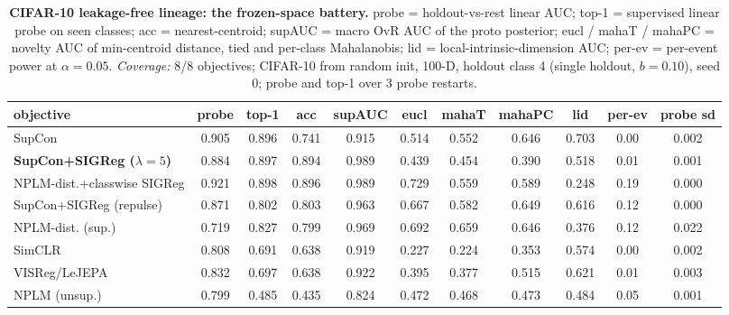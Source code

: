 \begin{landscape}
\begin{table}[p]
\centering
\footnotesize
\setlength{\tabcolsep}{3pt}
\begin{tabular}{lcccccccccc}
\toprule
objective & probe & top-1 & acc & supAUC & eucl & mahaT & mahaPC & lid & per-ev & probe sd \\
\midrule
SupCon & 0.905 & 0.896 & 0.741 & 0.915 & 0.514 & 0.552 & 0.646 & 0.703 & 0.00 & 0.002 \\
\textbf{SupCon+SIGReg ($\lambda{=}5$)} & 0.884 & 0.897 & 0.894 & 0.989 & 0.439 & 0.454 & 0.390 & 0.518 & 0.01 & 0.001 \\
NPLM-dist.+classwise SIGReg & 0.921 & 0.898 & 0.896 & 0.989 & 0.729 & 0.559 & 0.589 & 0.248 & 0.19 & 0.000 \\
SupCon+SIGReg (repulse) & 0.871 & 0.802 & 0.803 & 0.963 & 0.667 & 0.582 & 0.649 & 0.616 & 0.12 & 0.000 \\
NPLM-dist. (sup.) & 0.719 & 0.827 & 0.799 & 0.969 & 0.692 & 0.659 & 0.646 & 0.376 & 0.12 & 0.022 \\
SimCLR & 0.808 & 0.691 & 0.638 & 0.919 & 0.227 & 0.224 & 0.353 & 0.574 & 0.00 & 0.002 \\
VISReg/LeJEPA & 0.832 & 0.697 & 0.638 & 0.922 & 0.395 & 0.377 & 0.515 & 0.621 & 0.01 & 0.003 \\
NPLM (unsup.) & 0.799 & 0.485 & 0.435 & 0.824 & 0.472 & 0.468 & 0.473 & 0.484 & 0.05 & 0.001 \\
\bottomrule
\end{tabular}
\caption{\textbf{CIFAR-10 leakage-free lineage: the frozen-space battery.} probe = holdout-vs-rest linear AUC; top-1 = supervised linear probe on seen classes; acc = nearest-centroid; supAUC = macro OvR AUC of the proto posterior; eucl / mahaT / mahaPC = novelty AUC of min-centroid distance, tied and per-class Mahalanobis; lid = local-intrinsic-dimension AUC; per-ev = per-event power at $\alpha{=}0.05$. \emph{Coverage:} 8/8 objectives; CIFAR-10 from random init, 100-D, holdout class 4 (single holdout, $b=0.10$), seed 0; probe and top-1 over 3 probe restarts.}
\label{tab:app_cifar10_pre}
\end{table}
\end{landscape}
